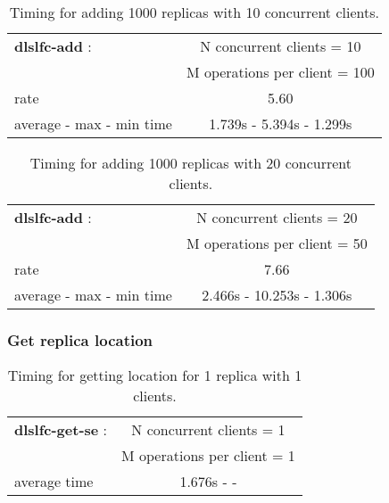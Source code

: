 \documentclass[pdftex]{cmspaper}
\begin{document}
\begin{table}[!htbp]
\begin{center}
 \begin{tabular}{|l|c|}         \hline
   {\bf dlslfc-add} : & N concurrent clients = 10  \\
   & M operations per client = 100\\ \hline
    rate             & 5.60 \\ \hline
    average - max - min time   & 1.739s - 5.394s - 1.299s \\ \hline
\end{tabular}
\caption {Timing for adding 1000 replicas with 10 concurrent clients.}\label{dlslfc-add}
\end{center}
\end{table}

\begin{table}[!htbp]
\begin{center}
 \begin{tabular}{|l|c|}         \hline
   {\bf dlslfc-add} : & N concurrent clients = 20  \\ 
 & M operations per client = 50\\ \hline
    rate             & 7.66 \\ \hline
    average - max - min time  & 2.466s - 10.253s - 1.306s \\ \hline
\end{tabular}
\caption {Timing for adding 1000 replicas with 20 concurrent clients.}\label{dlslfc-add}
\end{center}
\end{table}

\subsubsection{Get replica location}

\begin{table}[!htbp] 
\begin{center}
 \begin{tabular}{|l|c|}         \hline
   {\bf dlslfc-get-se} : & N concurrent clients = 1  \\ & M operations per client = 1\\ \hline
    average time     & 1.676s - - \\ \hline
\end{tabular}
\caption {Timing for getting location for 1 replica with 1 clients.}\label{dlslfc-get-se}
\end{center}
\end{table} 
\end{document}

